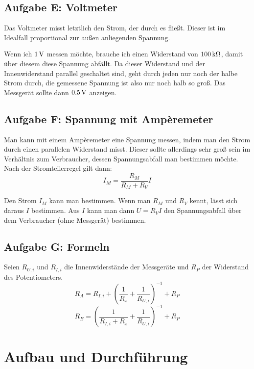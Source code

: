 \documentclass[11pt,german]{article}
\begin{document}
\subsection{Aufgabe E: Voltmeter}

Das Voltmeter misst letztlich den Strom, der durch es fließt. Dieser ist im
Idealfall proportional zur außen anliegenden Spannung.

Wenn ich $\unit[1]V$ messen möchte, brauche ich einen Widerstand von
$\unit[100]{k\Omega}$, damit über diesem diese Spannung abfällt. Da dieser
Widerstand und der Innenwiderstand parallel geschaltet sind, geht durch jeden
nur noch der halbe Strom durch, die gemessene Spannung ist also nur noch halb
so groß. Das Messgerät sollte dann $\unit[0.5]V$ anzeigen.

\subsection{Aufgabe F: Spannung mit Ampèremeter}

Man kann mit einem Ampèremeter eine Spannung messen, indem man den Strom durch
einen parallelen Widerstand misst. Dieser sollte allerdings sehr groß sein im
Verhältnis zum Verbraucher, dessen Spannungsabfall man bestimmen möchte. Nach
der Stromteilerregel gilt dann:
\[ I_M = \frac{R_M}{R_M + R_V} I \]

Den Strom $I_M$ kann man bestimmen. Wenn man $R_M$ und $R_V$ kennt, lässt sich
daraus $I$ bestimmen. Aus $I$ kann man dann $U = R_V I$ den Spannungsabfall
über dem Verbraucher (ohne Messgerät) bestimmen.

\subsection{Aufgabe G: Formeln}

Seien $R_{U, i}$ und $R_{I, i}$ die Innenwiderstände der Messgeräte und $R_P$
der Widerstand des Potentiometers.
\[ R_A = R_{I, i} + \left( \frac{1}{R_x} + \frac{1}{R_{U, i}} \right)^{-1} + R_P \]
\[ R_B = \left( \frac{1}{R_{I, i} + R_x} + \frac{1}{R_{U, i}} \right)^{-1} + R_P \]


\section{Aufbau und Durchführung}
\end{document}

